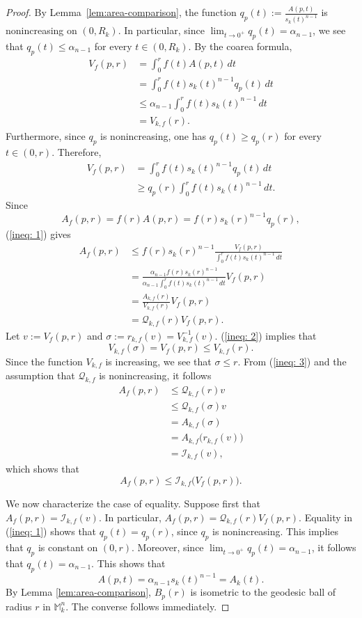 \documentclass[11pt]{article}
\begin{document}
\begin{proof}
By Lemma~\ref{lem:area-comparison}, the function $q_p(t):=\frac{A(p,t)}{s_k(t)^{n-1}}$ is nonincreasing on $(0,R_k)$. In particular, since $\lim_{t\to 0^+}q_p(t)=\alpha_{n-1}$, we see that $q_p(t)\leq \alpha_{n-1}$ for every $t\in(0,R_k)$. By the coarea formula,
\begin{align}
V_f(p,r)
&=\int_0^r f(t)A(p,t)\,dt \nonumber \\
&=\int_0^r f(t)s_k(t)^{n-1}q_p(t)\,dt \nonumber\\
&\leq
\alpha_{n-1}\int_0^r f(t)s_k(t)^{n-1}\,dt \nonumber\\
&=V_{k,f}(r). \label{ineq: 2}
\end{align}
Furthermore, since $q_p$ is nonincreasing, one has $q_p(t)\geq q_p(r)$ for every $t\in(0,r)$. Therefore,
\begin{align}
V_f(p,r)
&=\int_0^r f(t)s_k(t)^{n-1}q_p(t)\,dt \nonumber \\
&\geq
q_p(r)\int_0^r f(t)s_k(t)^{n-1}\,dt. \label{ineq: 1}
\end{align}
Since
$$
A_f(p,r)
=
f(r)A(p,r)
=
f(r)s_k(r)^{n-1}q_p(r),
$$
(\ref{ineq: 1}) gives
\begin{align}
A_f(p,r) &\leq f(r)s_k(r)^{n-1}\frac{V_f(p,r)}{\displaystyle\int_0^r f(t)s_k(t)^{n-1}\,dt} \nonumber\\
&=\frac{\alpha_{n-1}f(r)s_k(r)^{n-1}}{\displaystyle\alpha_{n-1}\int_0^r f(t)s_k(t)^{n-1}\,dt} V_f(p,r) \nonumber \\
&=\frac{A_{k,f}(r)}{V_{k,f}(r)}V_f(p,r) \nonumber \\
&=\mathcal{Q}_{k,f}(r)V_f(p,r). \label{ineq: 3}
\end{align}
Let $v:=V_f(p,r)$ and $\sigma:=r_{k,f}(v)=V_{k,f}^{-1}(v)$. (\ref{ineq: 2}) implies that
$$
V_{k,f}(\sigma) = V_f(p,r)\leq V_{k,f}(r).
$$
Since the function $V_{k,f}$ is increasing, we see that $\sigma\leq r$. From (\ref{ineq: 3}) and the assumption that $\mathcal{Q}_{k,f}$ is nonincreasing, it follows
\begin{align*}
A_f(p,r)
&\leq \mathcal{Q}_{k,f}(r)v \\
&\leq \mathcal{Q}_{k,f}(\sigma)v \\
&=A_{k,f}(\sigma) \\
&=A_{k,f}\bigl(r_{k,f}(v)\bigr) \\
&=\mathcal{I}_{k,f}(v),
\end{align*}
which shows that
$$
A_f(p,r)
\leq
\mathcal{I}_{k,f}\bigl(V_f(p,r)\bigr).
$$ 






We now characterize the case of equality. Suppose first that $A_f(p,r)=\mathcal{I}_{k,f}(v)$. In particular, $A_f(p,r)=\mathcal{Q}_{k,f}(r)V_f(p,r)$. Equality in (\ref{ineq: 1}) shows that  $q_p(t)=q_p(r)$, since $q_p$ is nonincreasing. This implies that $q_p$ is constant on $(0,r)$. Moreover, since $\lim_{t\to0^+}q_p(t)=\alpha_{n-1}$, it follows that $q_p(t)=\alpha_{n-1}$. This shows that
$$
A(p,t)=\alpha_{n-1}s_k(t)^{n-1}=A_k(t).
$$
By Lemma \ref{lem:area-comparison}, $B_p(r)$ is isometric to the geodesic ball of radius $r$ in $\mathbb{M}_k^n$. The converse follows immediately.


\end{proof}
\end{document}
